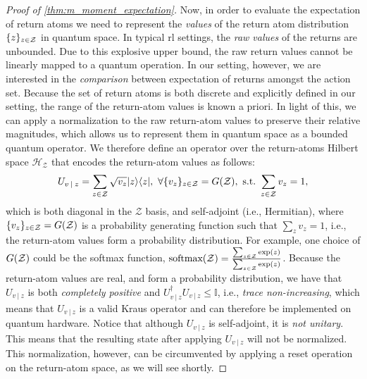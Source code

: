 \documentclass{article}
\DeclarePairedDelimiter{\bra}{\langle}{\rvert} %
\DeclarePairedDelimiter{\ket}{\lvert}{\rangle} %
\DeclarePairedDelimiter{\paren}{\lparen}{\rparen} %
\DeclarePairedDelimiter{\bparen}{[}{]} %
\DeclarePairedDelimiter{\set}{\{}{\}} %
\newcommand{\E}{\mathbb{E}} %
\newcommand{\hilbert}{\mathcal{H}} %
\newcommand{\pfunc}[2]{#1\paren*{#2}} %
\newcommand{\given}[1][]{\:#1\vert\:}
\begin{document}
\begin{proof}[Proof of \cref{thm:m_moment_expectation}]
Now, in order to evaluate the expectation of return atoms we need to represent the \emph{values} of the return atom distribution $\set{z}_{z \in \mathcal{Z}}$ in quantum space. In typical \ac{rl} settings, the \emph{raw values} of the returns are unbounded. Due to this explosive upper bound, the raw return values cannot be linearly mapped to a quantum operation.
% 
% 
In our setting, however, we are interested in the \emph{comparison} between expectation of returns amongst the action set. Because the set of return atoms is both discrete and explicitly defined in our setting, the range of the return-atom values is known a priori. In light of this, we can apply a normalization to the raw return-atom values to preserve their relative magnitudes, which allows us to represent them in quantum space as a bounded quantum operator.
% 
We therefore define an operator over the return-atoms Hilbert space $\hilbert_{\mathcal{Z}}$ that encodes the return-atom values as follows:
% 
\begin{equation}\label{eq:U_v_z}
U_{v \given z} 
= \sum_{z \in \mathcal{Z}} \sqrt{v_z} \ket{z}\bra{z},
~ \forall \set{v_{z}}_{z \in \mathcal{Z}} = \pfunc{G}{\mathcal{Z}}, ~\textrm{s.t.}~ \sum_{z \in \mathcal{Z}} v_z = 1,
\end{equation}
% 
which is both diagonal in the $\mathcal{Z}$ basis, and self-adjoint (i.e., Hermitian), where $\set{v_{z}}_{z \in \mathcal{Z}} = \pfunc{G}{\mathcal{Z}}$ is a probability generating function such that $\sum_{z} v_z = 1$, i.e., the return-atom values form a probability distribution. For example, one choice of $\pfunc{G}{\mathcal{Z}}$ could be the softmax function, $\pfunc{\textrm{softmax}}{\mathcal{Z}} = \frac{\sum_{z \in \mathcal{Z}} \pfunc{\exp}{z}}{\sum_{z \in \mathcal{Z}} \pfunc{\exp}{z}}$. Because the return-atom values are real, and form a probability distribution, we have that $U_{v \given z}$ is both \emph{completely positive} and $U_{v \given z}^{\dagger} U_{v \given z} \leq \mathbb{I}$, i.e., \emph{trace non-increasing}, which means that $U_{v \given z}$ is a valid Kraus operator and can therefore be implemented on quantum hardware.
% 
Notice that although $U_{v \given z}$ is self-adjoint, it is \emph{not unitary}. This means that the resulting state after applying $U_{v \given z}$ will not be normalized. This normalization, however, can be circumvented by applying a reset operation on the return-atom space, as we will see shortly.


\end{proof}
\end{document}
